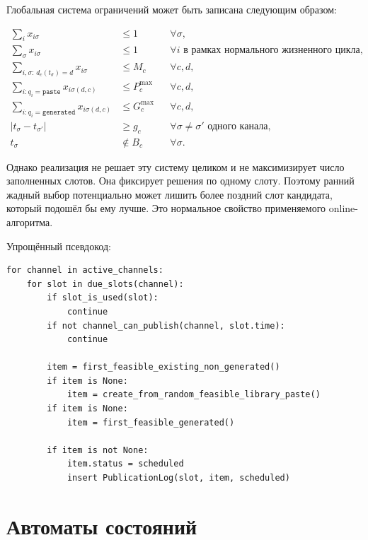 \documentclass[12pt,a4paper]{article}
\newcommand{\Source}[1]{\texttt{#1}}
\begin{document}
Глобальная система ограничений может быть записана следующим образом:

\begin{align}
  \sum_i x_{i\sigma}&\leq1
    &&\forall\sigma,
    \label{eq:csp-slot}\\
  \sum_\sigma x_{i\sigma}&\leq1
    &&\forall i\text{ в рамках нормального жизненного цикла},
    \label{eq:csp-item}\\
  \sum_{i,\sigma:\,d_c(t_\sigma)=d}x_{i\sigma}&\leq M_c
    &&\forall c,d,
    \label{eq:csp-day}\\
  \sum_{i:q_i=\Source{paste}}x_{i\sigma(d,c)}&\leq P_c^{\max}
    &&\forall c,d,
    \label{eq:csp-paste}\\
  \sum_{i:q_i=\Source{generated}}x_{i\sigma(d,c)}&\leq G_c^{\max}
    &&\forall c,d,
    \label{eq:csp-generated}\\
  |t_\sigma-t_{\sigma'}|&\geq g_c
    &&\forall\sigma\neq\sigma'\text{ одного канала},
    \label{eq:csp-gap}\\
  t_\sigma&\notin B_c
    &&\forall\sigma.
    \label{eq:csp-blackout}
\end{align}

Однако реализация не решает эту систему целиком и не максимизирует число
заполненных слотов. Она фиксирует решения по одному слоту. Поэтому ранний жадный
выбор потенциально может лишить более поздний слот кандидата, который подошёл бы
ему лучше. Это нормальное свойство применяемого online-алгоритма.

Упрощённый псевдокод:

\begin{lstlisting}
for channel in active_channels:
    for slot in due_slots(channel):
        if slot_is_used(slot):
            continue
        if not channel_can_publish(channel, slot.time):
            continue

        item = first_feasible_existing_non_generated()
        if item is None:
            item = create_from_random_feasible_library_paste()
        if item is None:
            item = first_feasible_generated()

        if item is not None:
            item.status = scheduled
            insert PublicationLog(slot, item, scheduled)
\end{lstlisting}

\section{Автоматы состояний}
\end{document}
